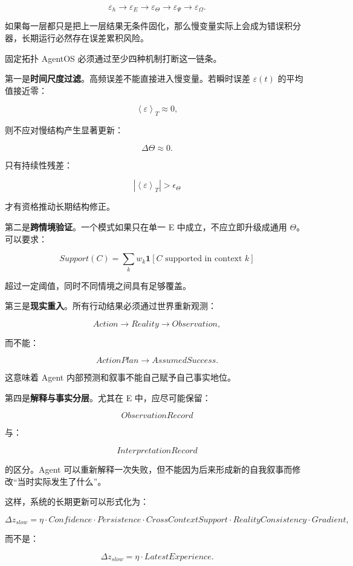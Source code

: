 \[
\varepsilon_h
\rightarrow
\varepsilon_E
\rightarrow
\varepsilon_\Theta
\rightarrow
\varepsilon_\Psi
\rightarrow
\varepsilon_\Omega.
\]

如果每一层都只是把上一层结果无条件固化，那么慢变量实际上会成为错误积分器，长期运行必然存在误差累积风险。

固定拓扑 AgentOS 必须通过至少四种机制打断这一链条。

第一是\textbf{时间尺度过滤}。高频误差不能直接进入慢变量。若瞬时误差 $\varepsilon(t)$ 的平均值接近零：

\[
\left\langle
\varepsilon
\right\rangle_T
\approx
0,
\]

则不应对慢结构产生显著更新：

\[
\Delta\Theta
\approx0.
\]

只有持续性残差：

\[
\left|
\left\langle
\varepsilon
\right\rangle_T
\right|
>
\epsilon_\Theta
\]

才有资格推动长期结构修正。

第二是\textbf{跨情境验证}。一个模式如果只在单一 E 中成立，不应立即升级成通用 $\Theta$。可以要求：

\[
Support(C)
=
\sum_{k}
w_k
\mathbf{1}
[
C\text{ supported in context }k
]
\]

超过一定阈值，同时不同情境之间具有足够覆盖。

第三是\textbf{现实重入}。所有行动结果必须通过世界重新观测：

\[
Action
\rightarrow
Reality
\rightarrow
Observation,
\]

而不能：

\[
ActionPlan
\rightarrow
AssumedSuccess.
\]

这意味着 Agent 内部预测和叙事不能自己赋予自己事实地位。

第四是\textbf{解释与事实分层}。尤其在 E 中，应尽可能保留：

\[
ObservationRecord
\]

与：

\[
InterpretationRecord
\]

的区分。Agent 可以重新解释一次失败，但不能因为后来形成新的自我叙事而修改“当时实际发生了什么”。

这样，系统的长期更新可以形式化为：

\[
\Delta z_{slow}
=
\eta
\cdot
Confidence
\cdot
Persistence
\cdot
CrossContextSupport
\cdot
RealityConsistency
\cdot
Gradient,
\]

而不是：

\[
\Delta z_{slow}
=
\eta
\cdot
LatestExperience.
\]

